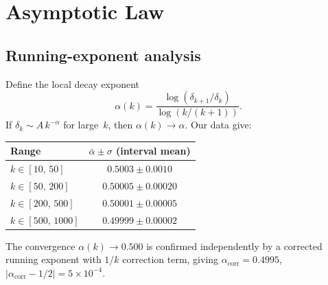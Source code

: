 \documentclass[11pt,a4paper]{article}
\theoremstyle{plain}
\theoremstyle{definition}
\theoremstyle{remark}
\newcommand{\abs}[1]{\lvert #1 \rvert}
\begin{document}
\section{Asymptotic Law}\label{sec:asymptotic}

\subsection{Running-exponent analysis}\label{sec:running}
Define the local decay exponent
\begin{equation}
  \alpha(k) = \frac{\log(\delta_{k+1}/\delta_k)}
    {\log(k/(k+1))}.
  \label{eq:running}
\end{equation}
If $\delta_k \sim A\,k^{-\alpha}$ for large~$k$, then
$\alpha(k) \to \alpha$.  Our data give:

\begin{center}
\begin{tabular}{@{}lc@{}}
\toprule
Range & $\bar\alpha \pm \sigma$ (interval mean) \\
\midrule
$k \in [10,\,50]$ & $0.5003 \pm 0.0010$ \\
$k \in [50,\,200]$  & $0.50005 \pm 0.00020$ \\
$k \in [200,\,500]$ & $0.50001 \pm 0.00005$ \\
$k \in [500,\,1000]$& $0.49999 \pm 0.00002$ \\
\bottomrule
\end{tabular}
\end{center}

\noindent
The convergence $\alpha(k) \to 0.500$ is confirmed independently
by a corrected running exponent with $1/k$ correction term, giving
$\alpha_{\mathrm{corr}} = 0.4995$,
$\abs{\alpha_{\mathrm{corr}} - 1/2} = 5 \times 10^{-4}$.
\end{document}
